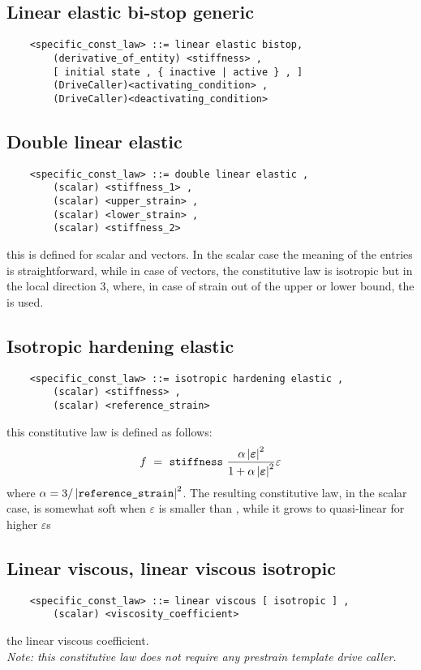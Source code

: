 \subsection{Linear elastic bi-stop generic}
\begin{verbatim}
    <specific_const_law> ::= linear elastic bistop,
        (derivative_of_entity) <stiffness> ,
        [ initial state , { inactive | active } , ]
        (DriveCaller)<activating_condition> ,
        (DriveCaller)<deactivating_condition>
\end{verbatim}
  
\subsection{Double linear elastic}
\begin{verbatim}
    <specific_const_law> ::= double linear elastic ,
        (scalar) <stiffness_1> ,
        (scalar) <upper_strain> ,
        (scalar) <lower_strain> ,
        (scalar) <stiffness_2>
\end{verbatim}
this is defined for scalar and  vectors. In the scalar case the
meaning of the entries is straightforward, while in case of  vectors,
the constitutive law is isotropic but in the local direction 3, where, in
case of strain out of the upper or lower bound, the  is
used.

\subsection{Isotropic hardening elastic}
\begin{verbatim}
    <specific_const_law> ::= isotropic hardening elastic ,
        (scalar) <stiffness> ,
        (scalar) <reference_strain>
\end{verbatim}
this constitutive law is defined as follows:
\begin{displaymath}
    f \ = \ \texttt{stiffness} \ \frac{
        \alpha\left| \boldsymbol{\varepsilon} \right|^2
    }{
        1+\alpha\left| \boldsymbol{\varepsilon} \right|^2
    }\varepsilon
\end{displaymath}
where $ \alpha=3/\left| \texttt{reference\_strain} \right|^2 $. The resulting
constitutive law, in the scalar case, is somewhat soft when
$ \varepsilon $ is smaller than , while it grows to
quasi-linear for higher $ \varepsilon$s

\subsection{Linear viscous, linear viscous isotropic}
\begin{verbatim}
    <specific_const_law> ::= linear viscous [ isotropic ] , 
        (scalar) <viscosity_coefficient>
\end{verbatim}
the linear viscous coefficient. \\
{\em 
    Note: this constitutive law does not require any prestrain template
    drive caller.
}
  
